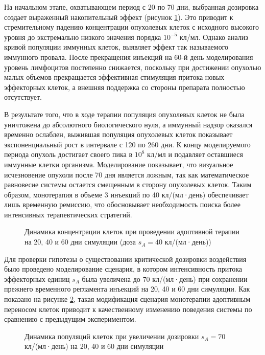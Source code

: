 На начальном этапе, охватывающем период с 20 по 70 дни,
выбранная дозировка создает выраженный накопительный эффект (рисунок
\ref{fig:sa_monotherapy_analysis}). Это приводит к
стремительному падению концентрации опухолевых клеток с исходного высокого
уровня до экстремально низкого значения порядка $10^{-5}$ кл/мл.
Однако анализ кривой популяции иммунных клеток, выявляет эффект так называемого иммунного
провала. После прекращения инъекций на 60-й день моделирования уровень лимфоцитов
постепенно снижается, поскольку при достижении опухолью малых объемов
прекращается эффективная стимуляция притока новых эффекторных клеток, а внешняя
поддержка со стороны препарата полностью отсутствует.

В результате того, что в ходе терапии популяция опухолевых клеток не была
уничтожена до абсолютного биологического нуля, а иммунный надзор оказался
временно ослаблен, выжившая популяция опухолевых клеток показывает экспоненциальный
рост в интервале с 120 по 260 дни. К концу моделируемого периода опухоль достигает своего
пика в $10^8$ кл/мл и подавляет оставшиеся иммунные клетки организма.
Моделирование показывает, что визуальное исчезновение опухоли после 70 дня
является ложным, так как математическое равновесие системы остается смещенным в
сторону опухолевых клеток. Таким образом, монотерапия в объеме 3 инъекций по
40 кл/(мл·день) обеспечивает лишь временную ремиссию, что обосновывает
необходимость поиска
более интенсивных терапевтических стратегий.

\begin{figure}[htbp]
  \centering
  
  \caption{Динамика концентрации клеток при проведении адоптивной терапии на
  20, 40 и 60 дни симуляции (доза $s_A =40$ кл/(мл·день))}
  \label{fig:sa_monotherapy_analysis}
\end{figure}

Для проверки гипотезы о существовании критической дозировки воздействия было
проведено моделирование сценария, в котором интенсивность притока эффекторных
единиц $s_A$ была увеличена до 70 кл/(мл·день) при сохранении прежнего
временного регламента инъекций на 20, 40 и 60 дни симуляции. Как показано на
рисунке \ref{fig:sa_elimination}, такая модификация сценария монотерапии
адоптивным переносом клеток приводит к качественному изменению поведения
системы по сравнению с предыдущим экспериментом.

\begin{figure}[ht!]
  \centering
  
  \caption{Динамика популяций клеток при увеличении дозировки $s_A =
  70$ кл/(мл·день) на 20, 40 и 60 дни симуляции}
  \label{fig:sa_elimination}
\end{figure}

